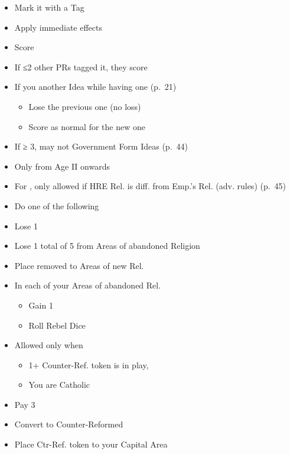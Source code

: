 \documentclass[10pt]{article}
\begin{document}
\begin{itemize}
	\item Mark it with a Tag
	\item Apply immediate effects
	\item Score 
	\item If ≤2 other PRs tagged it, they score 
	\item If you  another  Idea while having one (p.~21)
	\begin{itemize}
		\item Lose the previous one (no \prestige loss)
		\item Score \prestige as normal for the new one
	\end{itemize}
	\item If \authority ≥ 3,  may not  Government Form Ideas (p.~44)
\end{itemize}

\begin{itemize}
	\item Only from Age II onwards
	\item For , only allowed if HRE Rel. is diff. from Emp.'s Rel. (adv. rules) (p.~45)
	\item Do one of the following
\end{itemize}
\begin{itemize}
	\item Lose   1\stability
	\item Lose 1 \marriage {} total of 5 \influence from Areas of abandoned Religion
	\item Place removed \influence to Areas of new Rel.
	\item In each of your Areas of abandoned Rel.
	\begin{itemize}
		\item Gain 1 \unrest
		\item Roll Rebel Dice
	\end{itemize}
\end{itemize}
\begin{itemize}
	\item Allowed only when
	\begin{itemize}
		\item 1+ Counter-Ref. token is in play, 
		\item You are Catholic
	\end{itemize}
	\item Pay 3\adminpower
	\item Convert to Counter-Reformed
	\item Place Ctr-Ref. token to your Capital Area
\end{itemize}
\end{document}
